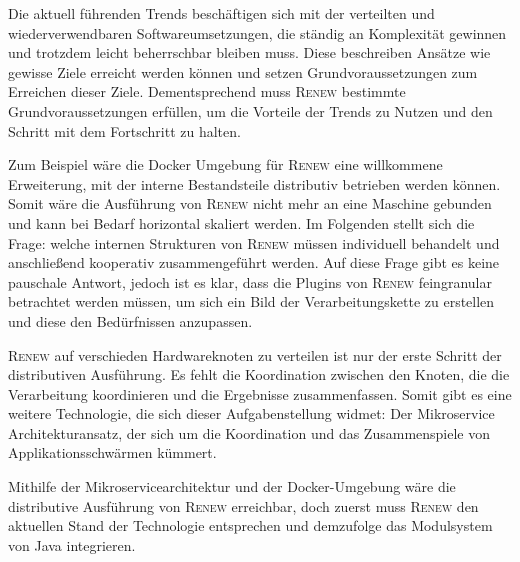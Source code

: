 		Die aktuell führenden Trends beschäftigen sich mit der verteilten und wiederverwendbaren Softwareumsetzungen, die ständig an Komplexität gewinnen und trotzdem leicht beherrschbar bleiben muss. Diese beschreiben Ansätze wie gewisse Ziele erreicht werden können und setzen Grundvoraussetzungen zum Erreichen dieser Ziele. Dementsprechend muss \textsc{Renew} bestimmte Grundvoraussetzungen erfüllen, um die Vorteile der Trends zu Nutzen und den Schritt mit dem Fortschritt zu halten.  \bigbreak

		Zum Beispiel wäre die Docker Umgebung für \textsc{Renew} eine willkommene Erweiterung, mit der interne Bestandsteile distributiv betrieben werden können. Somit wäre die Ausführung von \textsc{Renew} nicht mehr an eine Maschine gebunden und kann bei Bedarf horizontal skaliert werden. Im Folgenden stellt sich die Frage: welche internen Strukturen von \textsc{Renew} müssen individuell behandelt und anschließend kooperativ zusammengeführt werden. Auf diese Frage gibt es keine pauschale Antwort, jedoch ist es klar, dass die Plugins von \textsc{Renew} feingranular betrachtet werden müssen, um sich ein Bild der Verarbeitungskette zu erstellen und diese den Bedürfnissen anzupassen. \bigbreak

		\textsc{Renew} auf verschieden Hardwareknoten zu verteilen ist nur der erste Schritt der distributiven Ausführung. Es fehlt die Koordination zwischen den Knoten, die die Verarbeitung koordinieren und die Ergebnisse zusammenfassen. Somit gibt es eine weitere Technologie, die sich dieser Aufgabenstellung widmet: Der Mikroservice Architekturansatz, der sich um die Koordination und das Zusammenspiele von Applikationsschwärmen kümmert. \bigbreak

		Mithilfe der Mikroservicearchitektur und der Docker-Umgebung wäre die distributive Ausführung von \textsc{Renew} erreichbar, doch zuerst muss \textsc{Renew} den aktuellen Stand der Technologie entsprechen und demzufolge das Modulsystem von Java integrieren.  		
		
